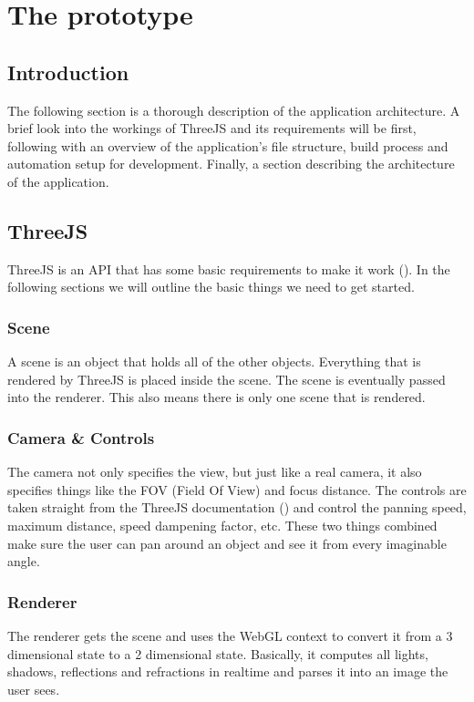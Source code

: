 \section{The prototype}
\subsection{Introduction}
The following section is a thorough description of the application architecture. A brief look into the workings of ThreeJS and its requirements will be first, following with an overview of the application's file structure, build process and automation setup for development. Finally, a section describing the architecture of the application.

\subsection{ThreeJS}
ThreeJS is an API that has some basic requirements to make it work (\cite{ThreeJSgettingStarted}). In the following sections we will outline the basic things we need to get started.
\subsubsection{Scene}
A scene is an object that holds all of the other objects. Everything that is rendered by ThreeJS is placed inside the scene. The scene is eventually passed into the renderer. This also means there is only one scene that is rendered.
\subsubsection{Camera \& Controls}
The camera not only specifies the view, but just like a real camera, it also specifies things like the FOV (Field Of View) and focus distance. The controls are taken straight from the ThreeJS documentation (\cite{ThreeJSgettingStarted}) and control the panning speed, maximum distance, speed dampening factor, etc. These two things combined make sure the user can pan around an object and see it from every imaginable angle.
\subsubsection{Renderer}
The renderer gets the scene and uses the WebGL context to convert it from a 3 dimensional state to a 2 dimensional state. Basically, it computes all lights, shadows, reflections and refractions in realtime and parses it into an image the user sees.
